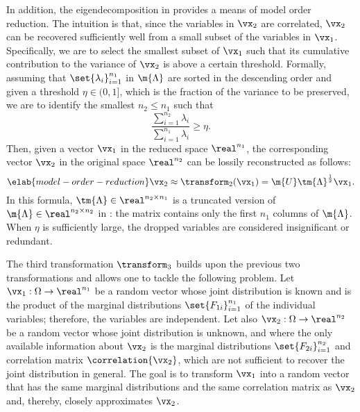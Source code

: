 In addition, the eigendecomposition in  provides a
means of model order reduction. The intuition is that, since the variables in
$\vx_2$ are correlated, $\vx_2$ can be recovered sufficiently well from a small
subset of the variables in $\vx_1$. Specifically, we are to select the smallest
subset of $\vx_1$ such that its cumulative contribution to the variance of
$\vx_2$ is above a certain threshold. Formally, assuming that
$\set{\lambda_i}_{i = 1}^{n_1}$ in $\m{\Lambda}$ are sorted in the descending
order and given a threshold $\eta \in (0, 1]$, which is the fraction of the
variance to be preserved, we are to identify the smallest $n_2 \leq n_1$ such
that
\[
  \frac{\sum_{i = 1}^{n_2} \lambda_i}{\sum_{i = 1}^{n_1} \lambda_i} \geq \eta.
\]
Then, given a vector $\vx_1$ in the reduced space $\real^{n_1}$, the
corresponding vector $\vx_2$ in the original space $\real^{n_2}$ can be lossily
reconstructed as follows:
\begin{equation} \elab{model-order-reduction}
  \vx_2 \approx \transform_2(\vx_1) = \m{U} \tm{\Lambda}^\frac{1}{2} \vx_1.
\end{equation}
In this formula, $\tm{\Lambda} \in \real^{n_2 \times n_1}$ is a truncated
version of $\m{\Lambda} \in \real^{n_2 \times n_2}$ in
: the matrix contains only the first $n_1$ columns of
$\m{\Lambda}$. When $\eta$ is sufficiently large, the dropped variables are
considered insignificant or redundant.

The third transformation $\transform_3$ builds upon the previous two
transformations and allows one to tackle the following problem. Let $\vx_1:
\Omega \to \real^{n_1}$ be a random vector whose joint distribution is known and
is the product of the marginal distributions $\set{F_{1i}}_{i = 1}^{n_1}$ of the
individual variables; therefore, the variables are independent. Let also $\vx_2:
\Omega \to \real^{n_2}$ be a random vector whose joint distribution is unknown,
and where the only available information about $\vx_2$ is the marginal
distributions $\set{F_{2i}}_{i = 1}^{n_2}$ and correlation matrix
$\correlation{\vx_2}$, which are not sufficient to recover the joint
distribution in general. The goal is to transform $\vx_1$ into a random vector
that has the same marginal distributions and the same correlation matrix as
$\vx_2$ and, thereby, closely approximates $\vx_2$.

